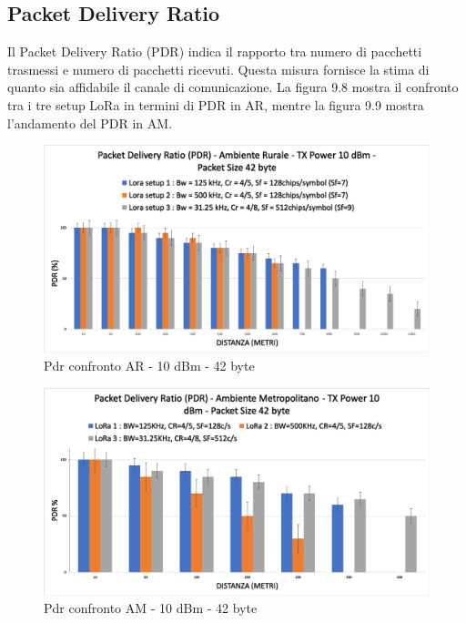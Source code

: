 \documentclass[12pt,a4paper,openright,twoside]{report}
\begin{document}
\subsection{Packet Delivery Ratio}
Il Packet Delivery Ratio (PDR) indica il rapporto tra numero di pacchetti trasmessi e numero di pacchetti ricevuti. Questa misura fornisce la stima di quanto sia affidabile il canale di comunicazione. La figura 9.8 mostra il confronto tra i tre setup LoRa in termini di PDR in AR, mentre la figura 9.9 mostra l'andamento del PDR in AM. 

\begin{figure}[h]                      
\begin{center} 
\includegraphics[width=\textwidth]{PDR_BAR_confronto_AR_10dBm-42byte.png}
\caption[Pdr confronto AR - 10 dBm - 42 byte]{Pdr confronto AR - 10 dBm - 42 byte}\label{fig:prima}
\end{center}
\end{figure}

\begin{figure}[h]                      
\begin{center} 
\includegraphics[width=\textwidth]{PDR_BAR_confronto_AM_10dBm-42byte.png}
\caption[Pdr confronto AM - 10 dBm - 42 byte]{Pdr confronto AM - 10 dBm - 42 byte}\label{fig:prima}
\end{center}
\end{figure}
\end{document}
